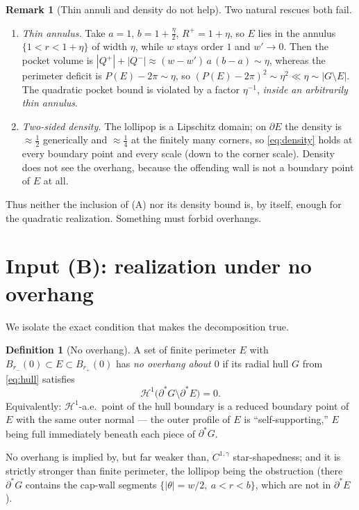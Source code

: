\documentclass[11pt]{article}
\theoremstyle{definition}
\newtheorem{definition}[theorem]{Definition}
\newtheorem{remark}[theorem]{Remark}
\newcommand{\HH}{\mathcal H}
\begin{document}
\begin{remark}[Thin annuli and density do not help]\label{rem:thin}
Two natural rescues both fail.
\begin{enumerate}[label=\textup{(\roman*)}]
\item \emph{Thin annulus.} Take $a=1$, $b=1+\tfrac\eta2$, $R^+=1+\eta$, so
$E$ lies in the annulus $\{1<r<1+\eta\}$ of width $\eta$, while $w$ stays
order $1$ and $w'\to0$. Then the pocket volume is
$|Q^+|+|Q^-|\approx(w-w')\,a\,(b-a)\sim\eta$, whereas the perimeter
deficit is $P(E)-2\pi\sim\eta$, so $(P(E)-2\pi)^2\sim\eta^2\ll\eta\sim
|G\setminus E|$. The quadratic pocket bound is violated by a factor
$\eta^{-1}$, \emph{inside an arbitrarily thin annulus}.
\item \emph{Two-sided density.} The lollipop is a Lipschitz domain; on
$\partial E$ the density is $\approx\tfrac12$ generically and
$\approx\tfrac14$ at the finitely many corners, so \eqref{eq:density}
holds at every boundary point and every scale (down to the corner scale).
Density does not see the overhang, because the offending wall is not a
boundary point of $E$ at all.
\end{enumerate}
Thus neither the inclusion of (A) nor its density bound is, by itself,
enough for the quadratic realization. Something must forbid overhangs.
\end{remark}

\section{Input (B): realization under no overhang}
\label{sec:realize}

We isolate the exact condition that makes the decomposition true.

\begin{definition}[No overhang]\label{def:noov}
A set of finite perimeter $E$ with $B_{r_-}(0)\subset E\subset B_{r_+}(0)$
has \emph{no overhang about $0$} if its radial hull $G$ from \eqref{eq:hull}
satisfies
\[
   \HH^1\bigl(\partial^*G\setminus\partial^*E\bigr)=0 .
\]
Equivalently: $\HH^1$-a.e.\ point of the hull boundary is a reduced
boundary point of $E$ with the same outer normal --- the outer profile of
$E$ is ``self-supporting,'' $E$ being full immediately beneath each piece
of $\partial^*G$.
\end{definition}

No overhang is implied by, but far weaker than, $C^{1,\gamma}$
star-shapedness; and it is strictly stronger than finite perimeter, the
lollipop being the obstruction (there $\partial^*G$ contains the cap-wall
segments $\{|\theta|=w/2,\ a<r<b\}$, which are not in $\partial^*E$).
\end{document}
